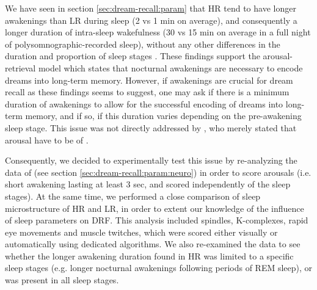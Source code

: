 We have seen in section \ref{sec:dream-recall:param} that HR tend to have longer awakenings than LR during sleep (2 vs 1 min on average), and consequently a longer duration of intra-sleep wakefulness (30 vs 15 min on average in a full night of polysomnographic-recorded sleep), without any other differences in the duration and proportion of sleep stages \citep{eichenlaub_brain_2014}. These findings support the arousal-retrieval model which states that nocturnal awakenings are necessary to encode dreams into long-term memory. However, if awakenings are crucial for dream recall as these findings seems to suggest, one may ask if there is a minimum duration of awakenings to allow for the successful encoding of dreams into long-term memory, and if so, if this duration varies depending on the pre-awakening sleep stage. This issue was not directly addressed by \citet{koulack_dream_1976}, who merely stated that arousal have to be of .

Consequently, we decided to experimentally test this issue by re-analyzing the data of \citet{eichenlaub_brain_2014} (see section \ref{sec:dream-recall:param:neuro}) in order to score arousals (i.e. short awakening lasting at least 3 sec, and scored independently of the sleep stages). At the same time, we performed a close comparison of sleep microstructure of HR and LR, in order to extent our knowledge of the influence of sleep parameters on DRF. This analysis included spindles, K-complexes, rapid eye movements and muscle twitches, which were scored either visually or automatically using dedicated algorithms. We also re-examined the data to see whether the longer awakening duration found in HR was limited to a specific sleep stages (e.g. longer nocturnal awakenings following periods of REM sleep), or was present in all sleep stages.


